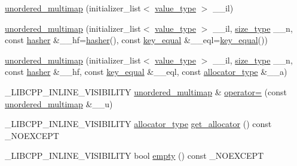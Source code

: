 \begin{DoxyCompactItemize}
\item 
\hyperlink{classunordered__multimap_a29c5dd4a78fd4bd8a9645931dc7f1caa}{unordered\+\_\+multimap} (initializer\+\_\+list$<$ \hyperlink{classunordered__multimap_a106d390dc0deafc47f10d3943b247ee6}{value\+\_\+type} $>$ \+\_\+\+\_\+il)
\item 
\hyperlink{classunordered__multimap_affbf2f2daf17c60953eddf1e4714a98c}{unordered\+\_\+multimap} (initializer\+\_\+list$<$ \hyperlink{classunordered__multimap_a106d390dc0deafc47f10d3943b247ee6}{value\+\_\+type} $>$ \+\_\+\+\_\+il, \hyperlink{classunordered__multimap_a977c4093df6d4d0302f280de19af4b58}{size\+\_\+type} \+\_\+\+\_\+n, const \hyperlink{classunordered__multimap_a93affc33f5ee930cff353ff62d20daef}{hasher} \&\+\_\+\+\_\+hf=\hyperlink{classunordered__multimap_a93affc33f5ee930cff353ff62d20daef}{hasher}(), const \hyperlink{classunordered__multimap_aeed817e3baaf0771b8336eb2477f4f02}{key\+\_\+equal} \&\+\_\+\+\_\+eql=\hyperlink{classunordered__multimap_aeed817e3baaf0771b8336eb2477f4f02}{key\+\_\+equal}())
\item 
\hyperlink{classunordered__multimap_a09bebef2465da44e4eebbdb744fa50ba}{unordered\+\_\+multimap} (initializer\+\_\+list$<$ \hyperlink{classunordered__multimap_a106d390dc0deafc47f10d3943b247ee6}{value\+\_\+type} $>$ \+\_\+\+\_\+il, \hyperlink{classunordered__multimap_a977c4093df6d4d0302f280de19af4b58}{size\+\_\+type} \+\_\+\+\_\+n, const \hyperlink{classunordered__multimap_a93affc33f5ee930cff353ff62d20daef}{hasher} \&\+\_\+\+\_\+hf, const \hyperlink{classunordered__multimap_aeed817e3baaf0771b8336eb2477f4f02}{key\+\_\+equal} \&\+\_\+\+\_\+eql, const \hyperlink{classunordered__multimap_a821ff3be687cecd9ef325efa93759c19}{allocator\+\_\+type} \&\+\_\+\+\_\+a)
\item 
\+\_\+\+L\+I\+B\+C\+P\+P\+\_\+\+I\+N\+L\+I\+N\+E\+\_\+\+V\+I\+S\+I\+B\+I\+L\+I\+T\+Y \hyperlink{classunordered__multimap}{unordered\+\_\+multimap} \& \hyperlink{classunordered__multimap_a79714c5cd7c01935d03ff987442fe2ca}{operator=} (const \hyperlink{classunordered__multimap}{unordered\+\_\+multimap} \&\+\_\+\+\_\+u)
\item 
\+\_\+\+L\+I\+B\+C\+P\+P\+\_\+\+I\+N\+L\+I\+N\+E\+\_\+\+V\+I\+S\+I\+B\+I\+L\+I\+T\+Y \hyperlink{classunordered__multimap_a821ff3be687cecd9ef325efa93759c19}{allocator\+\_\+type} \hyperlink{classunordered__multimap_a7265f5459ad95df57a42f8d43a32515a}{get\+\_\+allocator} () const \+\_\+\+N\+O\+E\+X\+C\+E\+P\+T
\item 
\+\_\+\+L\+I\+B\+C\+P\+P\+\_\+\+I\+N\+L\+I\+N\+E\+\_\+\+V\+I\+S\+I\+B\+I\+L\+I\+T\+Y bool \hyperlink{classunordered__multimap_a9ddf167fe2eefec358dd9b1949bb5d20}{empty} () const \+\_\+\+N\+O\+E\+X\+C\+E\+P\+T

\end{DoxyCompactItemize}
